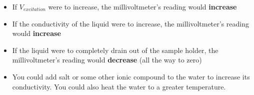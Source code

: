 





\begin{itemize}
\item{} If $V_{excitation}$ were to increase, the millivoltmeter's reading would {\bf increase}
\vskip 5pt
\item{} If the conductivity of the liquid were to increase, the millivoltmeter's reading would {\bf increase}
\vskip 5pt
\item{} If the liquid were to completely drain out of the sample holder, the millivoltmeter's reading would {\bf decrease} (all the way to zero)
\vskip 5pt
\item{} You could add salt or some other ionic compound to the water to increase its conductivity.  You could also heat the water to a greater temperature.
\end{itemize}











